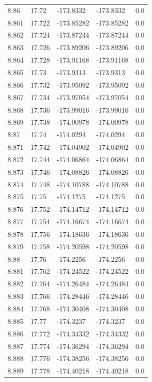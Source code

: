 \begin{tabular}{lllll}
8.86 & 17.72 & -173.8332 & -173.8332 & 0.0 \\
8.861 & 17.722 & -173.85282 & -173.85282 & 0.0 \\
8.862 & 17.724 & -173.87244 & -173.87244 & 0.0 \\
8.863 & 17.726 & -173.89206 & -173.89206 & 0.0 \\
8.864 & 17.728 & -173.91168 & -173.91168 & 0.0 \\
8.865 & 17.73 & -173.9313 & -173.9313 & 0.0 \\
8.866 & 17.732 & -173.95092 & -173.95092 & 0.0 \\
8.867 & 17.734 & -173.97054 & -173.97054 & 0.0 \\
8.868 & 17.736 & -173.99016 & -173.99016 & 0.0 \\
8.869 & 17.738 & -174.00978 & -174.00978 & 0.0 \\
8.87 & 17.74 & -174.0294 & -174.0294 & 0.0 \\
8.871 & 17.742 & -174.04902 & -174.04902 & 0.0 \\
8.872 & 17.744 & -174.06864 & -174.06864 & 0.0 \\
8.873 & 17.746 & -174.08826 & -174.08826 & 0.0 \\
8.874 & 17.748 & -174.10788 & -174.10788 & 0.0 \\
8.875 & 17.75 & -174.1275 & -174.1275 & 0.0 \\
8.876 & 17.752 & -174.14712 & -174.14712 & 0.0 \\
8.877 & 17.754 & -174.16674 & -174.16674 & 0.0 \\
8.878 & 17.756 & -174.18636 & -174.18636 & 0.0 \\
8.879 & 17.758 & -174.20598 & -174.20598 & 0.0 \\
8.88 & 17.76 & -174.2256 & -174.2256 & 0.0 \\
8.881 & 17.762 & -174.24522 & -174.24522 & 0.0 \\
8.882 & 17.764 & -174.26484 & -174.26484 & 0.0 \\
8.883 & 17.766 & -174.28446 & -174.28446 & 0.0 \\
8.884 & 17.768 & -174.30408 & -174.30408 & 0.0 \\
8.885 & 17.77 & -174.3237 & -174.3237 & 0.0 \\
8.886 & 17.772 & -174.34332 & -174.34332 & 0.0 \\
8.887 & 17.774 & -174.36294 & -174.36294 & 0.0 \\
8.888 & 17.776 & -174.38256 & -174.38256 & 0.0 \\
8.889 & 17.778 & -174.40218 & -174.40218 & 0.0 \\

\end{tabular}
